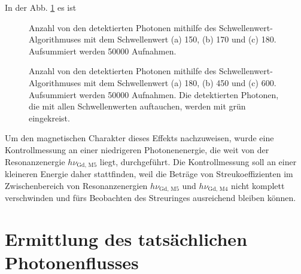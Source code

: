 \noindent
In der Abb. \ref{fig:th_150_170_180} es ist 
\begin{figure}[H]
    \centering
    
    \caption{Anzahl von den detektierten Photonen mithilfe des Schwellenwert-Algorithmuses mit dem Schwellenwert (a) \SI{150}{\adu}, (b) \SI{170}{\adu} und (c) \SI{180}{\adu}. Aufsummiert werden \num{50000} Aufnahmen.}
    \label{fig:th_150_170_180}
\end{figure}
\begin{figure}[H]
    \centering
    
    \caption{Anzahl von den detektierten Photonen mithilfe des Schwellenwert-Algorithmuses mit dem Schwellenwert (a) \SI{180}{\adu}, (b) \SI{450}{\adu} und (c) \SI{600}{\adu}. Aufsummiert werden \num{50000} Aufnahmen. Die detektierten Photonen, die mit allen Schwellenwerten auftauchen, werden mit grün eingekreist. }
    \label{fig:th_180_450_600}
\end{figure}



\noindent
Um den magnetischen Charakter dieses Effekts nachzuweisen, wurde eine Kontrollmessung an einer niedrigeren Photonenenergie, die weit von der Resonanzenergie $h\nu_{\text{Gd, M5}}$ liegt, durchgeführt. Die Kontrollmessung soll an einer kleineren Energie daher stattfinden, weil die Beträge von Streukoeffizienten im Zwischenbereich von Resonanzenergien $h\nu_{\text{Gd, M5}}$ und $h\nu_{\text{Gd, M4}}$ nicht komplett verschwinden und fürs Beobachten des Streuringes ausreichend bleiben können.

\section{Ermittlung des tatsächlichen Photonenflusses}
\label{text:butterfly_counting}

